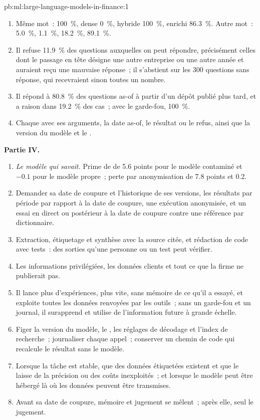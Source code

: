 \begin{solution}{pb:ml:large-language-models-in-finance:1}
\begin{enumerate}[resume]
\item Même mot~:  100~\%, dense 0~\%, hybride 100~\%,  enrichi 86.3~\%. Autre mot~: 5.0~\%, 1.1~\%, 18.2~\%, 89.1~\%.
\item Il refuse 11.9~\% des questions auxquelles on peut répondre, précisément celles dont le passage en tête désigne une autre entreprise ou une autre année et
auraient reçu une mauvaise réponse~; il s'abstient sur les 300 questions sans réponse, qui recevraient sinon toutes un nombre.
\item Il répond à 80.8~\% des questions as-of à partir d'un dépôt publié plus tard, et a raison dans 19.2~\% des cas~; avec le
garde-fou, 100~\%.
\item Chaque  avec ses arguments, la date as-of, le résultat ou le refus, ainsi que la version du modèle et le .
\end{enumerate}
\textbf{Partie IV.}
\begin{enumerate}[resume]
\item \emph{Le modèle qui savait.} Prime de  de 5.6 points pour le modèle contaminé et $-0.1$ pour le modèle propre~;
perte par anonymisation de 7.8 points et 0.2.
\item Demander sa date de coupure et l'historique de ses versions, les résultats par période par rapport à la date de coupure, une exécution anonymisée, et un essai en direct ou
postérieur à la date de coupure contre une référence par dictionnaire.
\item Extraction, étiquetage et synthèse avec la source citée, et rédaction de code avec tests~: des sorties qu'une personne ou un test
peut vérifier.
\item Les informations privilégiées, les données clients et tout ce que la firme ne publierait pas.
\item Il lance plus d'expériences, plus vite, sans mémoire de ce qu'il a essayé, et exploite toutes les données renvoyées par les outils~; sans un
garde-fou et un journal, il surapprend et utilise de l'information future à grande échelle.
\item Figer la version du modèle, le , les réglages de décodage et l'index de recherche~; journaliser chaque appel~; conserver un chemin de code qui recalcule
le résultat sans le modèle.
\item Lorsque la tâche est stable, que des données étiquetées existent et que le  laisse de la précision ou des coûts inexploités~; et lorsque le modèle
peut être hébergé là où les données peuvent être transmises.
\item Avant sa date de coupure, mémoire et jugement se mêlent~; après elle, seul le jugement.
\end{enumerate}
\end{solution}

